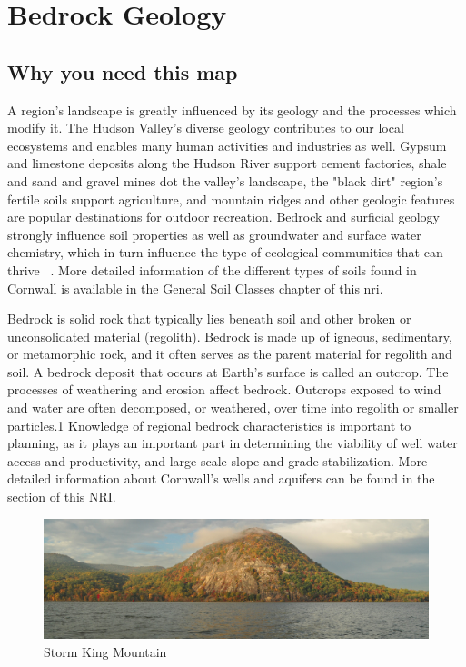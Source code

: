 \section{Bedrock Geology}\label{subsec:bedrock}
\subsection*{Why you need this map}
A region's landscape is greatly influenced by its geology and the processes 
which modify it. The Hudson Valley’s diverse geology contributes to our local 
ecosystems and enables many human activities and industries as well. Gypsum and 
limestone deposits along the Hudson River support cement factories, shale and 
sand and gravel mines dot the valley’s landscape, the "black dirt" region’s 
fertile soils support agriculture, and mountain ridges and other geologic 
features are popular destinations for outdoor recreation. Bedrock and surficial 
geology strongly influence soil properties as well as groundwater and surface 
water chemistry, which in turn influence the type of ecological communities that 
can thrive ~\citep{haeckel2014}. More detailed information of the different types 
of soils found in Cornwall is available in the General Soil Classes chapter of 
this \gls{nri}.

Bedrock is solid rock that typically lies beneath soil and other broken or 
unconsolidated material (regolith). Bedrock is made up of igneous, sedimentary, 
or metamorphic rock, and it often serves as the parent material for regolith 
and soil. A bedrock deposit that occurs at Earth’s surface is called an 
outcrop. The processes of weathering and erosion affect bedrock. Outcrops 
exposed to wind and water are often decomposed, or weathered, over time into 
regolith or smaller particles.1 Knowledge of regional bedrock characteristics is 
important to planning, as it plays an important part in determining the 
viability of well water access and productivity, and large scale slope and grade 
stabilization. More detailed information about Cornwall's wells and aquifers can 
be found in the ~ section of this NRI.

\begin{figure}
  \begin{centering}
    \includegraphics[width=\textwidth]{images/stormking.jpg}
    \vspace{-10pt}
    \caption{Storm King Mountain}\label{fig:stormking}
  \end{centering}
\end{figure}

